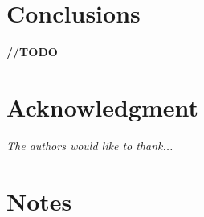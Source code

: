 \documentclass[journal,onecolumn]{IEEEtran}
\begin{document}
%
%
%
\section{Conclusions}

\textbf{//TODO}


%
%
%
\section*{Acknowledgment}

\textit{The authors would like to thank...}


%
%
%
\section*{Notes}
\end{document}

